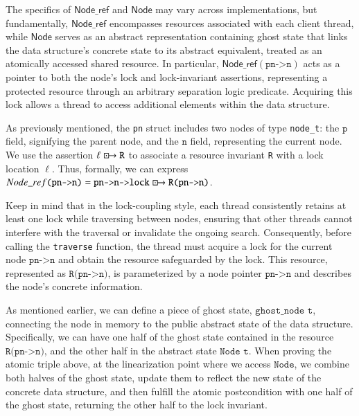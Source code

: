 \documentclass[a4paper,UKenglish,cleveref, autoref, thm-restate]{lipics-v2021}
\newcommand{\islock}{\boxdotright}
\newcommand{\lockvar}{\islock}
\newcommand{\treerep}{\ensuremath{\mathsf{Node}}}
\newcommand{\nodeboxrep}{\ensuremath{\mathsf{Node\_ref}}}
\newcommand{\than}[1]{\textbf{\textcolor{blue}{[Than: #1]}}}
\begin{document}

The specifics of $\nodeboxrep$ and $\treerep$ may vary across implementations, but fundamentally, $\nodeboxrep$ encompasses resources associated with each client thread, while $\treerep$ serves as an abstract representation containing ghost state that links the data structure's concrete state to its abstract equivalent, treated as an atomically accessed shared resource. In particular, $\nodeboxrep(\texttt{pn->n})$ acts as a pointer to both the node's lock and lock-invariant assertions, representing a protected resource through an arbitrary separation logic predicate. Acquiring this lock allows a thread to access additional elements within the data structure.

As previously mentioned, the \lstinline{pn} struct includes two nodes of type \lstinline{node_t}: the $\texttt{p}$ field, signifying the parent node, and the $\texttt{n}$ field, representing the current node. We use the assertion $\ell \lockvar \texttt{R}$ to associate a resource invariant \texttt{R} with a lock location $\ell$. Thus, formally, we can express $\nodeboxrep \texttt{(pn->n)} = \texttt{pn->n->lock} \lockvar \texttt{R(pn->n)}$.

Keep in mind that in the lock-coupling style, each thread consistently retains at least one lock while traversing between nodes, ensuring that other threads cannot interfere with the traversal or invalidate the ongoing search. Consequently, before calling the \texttt{traverse} function, the thread must acquire a lock for the current node $\texttt{pn->n}$ and obtain the resource safeguarded by the lock. This resource, represented as $\texttt{R(pn->n)}$, is parameterized by a node pointer $\texttt{pn->n}$ and describes the node's concrete information.

As mentioned earlier, we can define a piece of ghost state, $\texttt{ghost\_node t}$, connecting the node in memory to the public abstract state of the data structure. Specifically, we can have one half of the ghost state contained in the resource $\texttt{R(pn->n)}$, and the other half in the abstract state $\texttt{Node t}$. When proving the atomic triple above, at the linearization point where we access $\texttt{Node}$, we combine both halves of the ghost state, update them to reflect the new state of the concrete data structure, and then fulfill the atomic postcondition with one half of the ghost state, returning the other half to the lock invariant.
\end{document}
